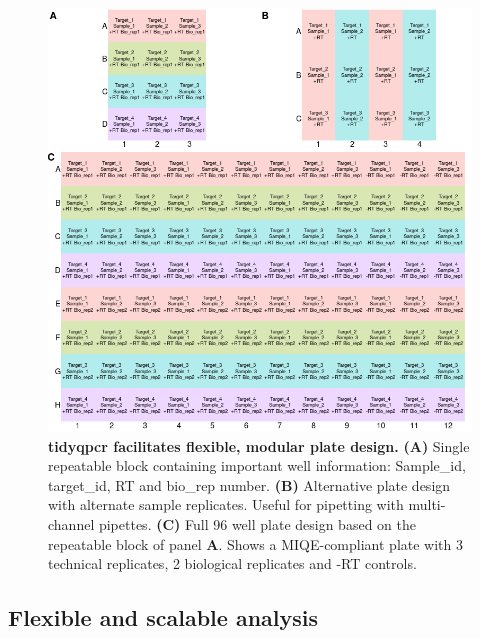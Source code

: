 \documentclass{SBCbookchapter}
\begin{document}
\begin{figure}[t]

{\centering \includegraphics[width=1\linewidth]{figures/combined_plate_plans.png} 

}

\caption{\textbf{tidyqpcr facilitates flexible, modular plate design.} \textbf{(A)} Single repeatable block containing important well information: Sample\_id, target\_id, RT and bio\_rep number. \textbf{(B)} Alternative plate design with alternate sample replicates. Useful for pipetting with multi-channel pipettes. \textbf{(C)} Full 96 well plate design based on the repeatable block of panel \textbf{A}. Shows a MIQE-compliant plate with 3 technical replicates, 2 biological replicates and -RT controls.} \label{fig:combined-plate-design}
\end{figure}



\subsection{Flexible and scalable analysis}
\end{document}
